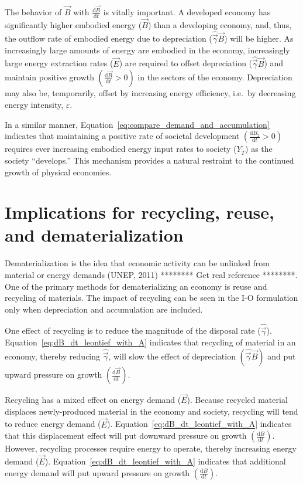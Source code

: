 The behavior of $\vec{B}$ with $\frac{\mathrm{d}\vec{B}}{\mathrm{d}t}$ 
is vitally important. 
A developed economy has significantly higher embodied energy ($\vec{B}$) 
than a developing economy, and, thus, 
the outflow rate of embodied energy 
due to depreciation ($\hat{\vec{\gamma}}\vec{B}$) will be higher. 
As increasingly large amounts of energy are embodied in the economy, 
increasingly large energy extraction rates ($\vec{E}$) 
are required to offset depreciation ($\hat{\vec{\gamma}}\vec{B}$) 
and maintain positive growth $\left(\frac{\mathrm{d}\vec{B}}{\mathrm{d}t} > 0\right)$ 
in the sectors of the economy. 
Depreciation may also be, temporarily, 
offset by increasing energy efficiency, i.e.\ by decreasing energy intensity, $\varepsilon$.

In a similar manner, 
Equation~\ref{eq:compare_demand_and_accumulation} 
indicates that maintaining a positive rate of societal development 
$\left(\frac{\mathrm{d}B_{2}}{\mathrm{d}t} > 0\right)$ 
requires ever increasing embodied energy input rates 
to society ($Y_{\dot{T}}$) as the society ``develops.'' 
This mechanism provides a natural restraint
to the continued growth of physical economies.


\section{Implications for recycling, reuse, and dematerialization}

Dematerialization is the idea that economic activity can be unlinked 
from material or energy demands (UNEP, 2011) 
******** Get real reference ********. 
One of the primary methods for dematerializing an economy 
is reuse and recycling of materials. 
The impact of recycling can be seen in the I-O formulation 
only when depreciation and accumulation are included. 

One effect of recycling is to reduce the magnitude 
of the disposal rate 
($\hat{\vec{\gamma}}$). 
Equation~\ref{eq:dB_dt_leontief_with_A} indicates that 
recycling of material in an economy, 
thereby reducing $\hat{\vec{\gamma}}$, 
will slow the effect of depreciation 
$\left(\hat{\vec{\gamma}}\vec{B}\right)$ 
and put upward pressure on growth 
$\left(\frac{\mathrm{d}\vec{B}}{\mathrm{d}t}\right)$. 

Recycling has a mixed effect on energy demand ($\vec{E}$). 
Because recycled material displaces newly-produced material 
in the economy and society, 
recycling will tend to reduce energy demand ($\vec{E}$). 
Equation~\ref{eq:dB_dt_leontief_with_A} indicates that 
this displacement effect will put downward pressure on growth 
$\left(\frac{\mathrm{d}B}{\mathrm{d}t}\right)$. 
However, recycling processes require energy to operate, 
thereby increasing energy demand ($\vec{E}$). 
Equation~\ref{eq:dB_dt_leontief_with_A} indicates that 
additional energy demand will put upward pressure on growth 
$\left(\frac{\mathrm{d}B}{\mathrm{d}t}\right)$. 

